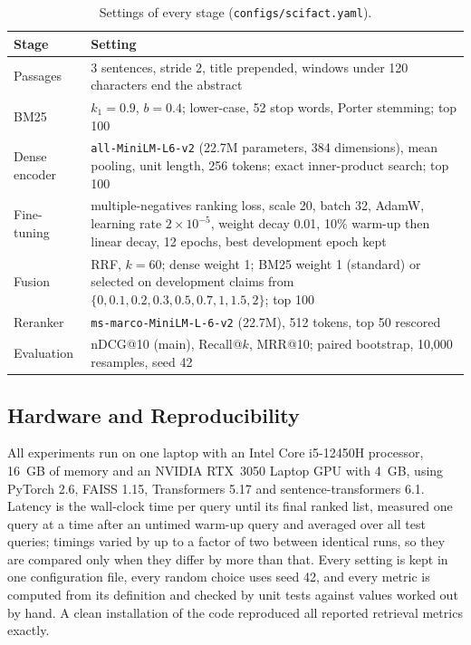 \begin{table}[t]
\centering\small
\caption{Settings of every stage (\texttt{configs/scifact.yaml}).}
\label{tab:settings}
\begin{tabularx}{\textwidth}{@{}lL@{}}
\toprule
Stage & Setting \\
\midrule
Passages & 3 sentences, stride 2, title prepended, windows under 120 characters end the abstract \\
BM25 & $k_1 = 0.9$, $b = 0.4$; lower-case, 52 stop words, Porter stemming; top 100 \\
Dense encoder & \texttt{all-MiniLM-L6-v2} (22.7M parameters, 384 dimensions), mean pooling, unit length, 256 tokens; exact inner-product search; top 100 \\
Fine-tuning & multiple-negatives ranking loss, scale 20, batch 32, AdamW, learning rate $2 \times 10^{-5}$, weight decay 0.01, 10\% warm-up then linear decay, 12 epochs, best development epoch kept \\
Fusion & RRF, $k = 60$; dense weight 1; BM25 weight 1 (standard) or selected on development claims from $\{0, 0.1, 0.2, 0.3, 0.5, 0.7, 1, 1.5, 2\}$; top 100 \\
Reranker & \texttt{ms-marco-MiniLM-L-6-v2} (22.7M), 512 tokens, top 50 rescored \\
Evaluation & nDCG@10 (main), Recall@$k$, MRR@10; paired bootstrap, 10,000 resamples, seed 42 \\
\bottomrule
\end{tabularx}
\end{table}

\subsection{Hardware and Reproducibility}
\label{sec:hardware}

All experiments run on one laptop with an Intel Core i5-12450H processor, 16~GB of memory and an
NVIDIA RTX~3050 Laptop GPU with 4~GB, using PyTorch 2.6, FAISS 1.15, Transformers 5.17 and
sentence-transformers 6.1. Latency is the wall-clock time per query until its final ranked list,
measured one query at a time after an untimed warm-up query and averaged over all test queries;
timings varied by up to a factor of two between identical runs, so they are compared only when
they differ by more than that. Every setting is kept in one configuration file, every random
choice uses seed 42, and every metric is computed from its definition and checked by unit tests
against values worked out by hand. A clean installation of the code reproduced all reported
retrieval metrics exactly.
